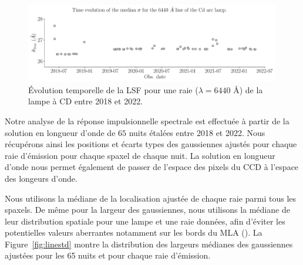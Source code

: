 \documentclass[../main/main.tex]{subfiles}
\begin{document}
\begin{figure}[ht]
  \centering
  \includegraphics[width=0.99\textwidth]{../figures/06_irf/timefct_Cdline.pdf}
  \caption[\'Evolution temporelle de la LSF pour une raie de la lampe à
  CD entre 2018 et 2022.]{\'Evolution temporelle de la LSF pour une raie
    ($\lambda=6440$ \AA) de la lampe à
  CD entre 2018 et 2022.}
  \label{fig:timefct_Cdline}
\end{figure}
Notre analyse de la réponse impulsionnelle spectrale est effectuée à
partir de la solution en longueur d'onde de $65$ nuits
étalées entre 2018 et 2022. Nous récupérons ainsi les positions et
écarts types des gaussiennes ajustés pour chaque raie d'émission pour chaque spaxel de
chaque nuit. La solution en longueur d'onde nous permet également de
passer de l'espace des pixels du CCD à l'espace des longeurs d'onde.

Nous utilisons la médiane de la localisation ajustée de chaque raie
parmi tous les spaxels. De même pour la largeur des gaussiennes, nous utilisons la
médiane de leur distribution spatiale pour une lampe et
une raie données, afin d'éviter les potentielles
valeurs aberrantes notamment sur les bords du MLA (\citet{pysedm}). La
Figure~\ref{fig:linestd} montre la distribution des largeurs médianes
des gaussiennes ajustées pour les 65 nuits et pour chaque raie d'émission.
 
\end{document}
